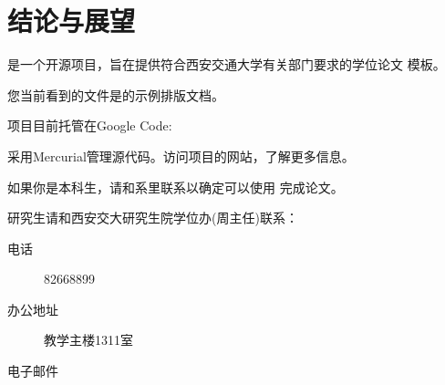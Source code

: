 
\section{结论与展望}

     是一个开源项目，旨在提供符合西安交通大学有关部门要求的学位论文 模板。

    您当前看到的文件是的示例排版文档。

 项目目前托管在Google Code: 
    
    采用Mercurial管理源代码。访问项目的网站，了解更多信息。


        如果你是本科生，请和系里联系以确定可以使用 完成论文。

        研究生请和西安交大研究生院学位办(周主任)联系：
        
        \begin{description}
            \item[电话] 82668899
            \item[办公地址] 教学主楼1311室
            \item[电子邮件]
        \end{description}
